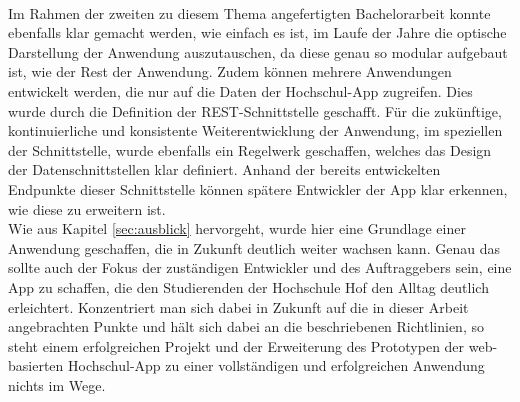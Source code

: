 \\
\linebreak
Im Rahmen der zweiten zu diesem Thema angefertigten Bachelorarbeit konnte ebenfalls klar gemacht werden, wie einfach es ist, im Laufe der Jahre die optische Darstellung der Anwendung auszutauschen, da diese genau so modular aufgebaut ist, wie der Rest der Anwendung. Zudem können mehrere Anwendungen entwickelt werden, die nur auf die Daten der Hochschul-\ac{App} zugreifen. Dies wurde durch die Definition der \ac{REST}-Schnittstelle geschafft. Für die zukünftige, kontinuierliche und konsistente Weiterentwicklung der Anwendung, im speziellen der Schnittstelle, wurde ebenfalls ein Regelwerk geschaffen, welches das Design der Datenschnittstellen klar definiert. Anhand der bereits entwickelten Endpunkte dieser Schnittstelle können spätere Entwickler der \ac{App} klar erkennen, wie diese zu erweitern ist. 
\\
\linebreak
Wie aus Kapitel \ref{sec:ausblick} hervorgeht, wurde hier eine Grundlage einer Anwendung geschaffen, die in Zukunft deutlich weiter wachsen kann. Genau das sollte auch der Fokus der zuständigen Entwickler und des Auftraggebers sein, eine \ac{App} zu schaffen, die den Studierenden der Hochschule Hof den Alltag deutlich erleichtert. Konzentriert man sich dabei in Zukunft auf die in dieser Arbeit angebrachten Punkte und hält sich dabei an die beschriebenen Richtlinien, so steht einem erfolgreichen Projekt und der Erweiterung des Prototypen der web-basierten Hochschul-\ac{App} zu einer vollständigen und erfolgreichen Anwendung nichts im Wege.
